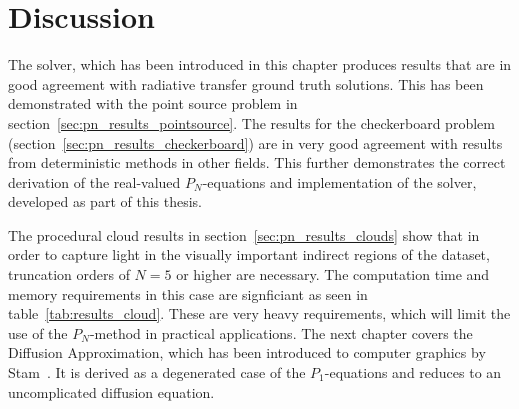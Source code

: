 \section{Discussion}

The solver, which has been introduced in this chapter produces results that are in good agreement with radiative transfer ground truth solutions. This has been demonstrated with the point source problem in section~\ref{sec:pn_results_pointsource}. The results for the checkerboard problem (section~\ref{sec:pn_results_checkerboard}) are in very good agreement with results from deterministic methods in other fields. This further demonstrates the correct derivation of the real-valued $P_N$-equations and implementation of the solver, developed as part of this thesis.

The procedural cloud results in section~\ref{sec:pn_results_clouds} show that in order to capture light in the visually important indirect regions of the dataset, truncation orders of $N=5$ or higher are necessary. The computation time and memory requirements in this case are signficiant as seen in table~\ref{tab:results_cloud}. These are very heavy requirements, which will limit the use of the $P_N$-method in practical applications. The next chapter covers the Diffusion Approximation, which has been introduced to computer graphics by Stam~\cite{Stam95}. It is derived as a degenerated case of the $P_1$-equations and reduces to an uncomplicated diffusion equation.